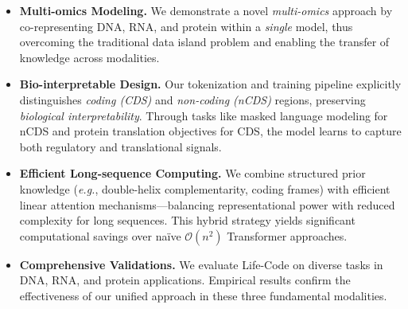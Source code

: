 \begin{itemize}
    \vspace{-0.5em}
    \item \textbf{Multi-omics Modeling.} 
    We demonstrate a novel \textit{multi-omics} approach by co-representing DNA, RNA, and protein within a \textit{single} model, thus overcoming the traditional data island problem and enabling the transfer of knowledge across modalities.
    
    \vspace{-2pt}
    \item \textbf{Bio-interpretable Design.} 
    Our tokenization and training pipeline explicitly distinguishes \textit{coding (CDS)} and \textit{non-coding (nCDS)} regions, preserving \textit{biological interpretability}. Through tasks like masked language modeling for nCDS and protein translation objectives for CDS, the model learns to capture both regulatory and translational signals.

    \vspace{-2pt}
    \item \textbf{Efficient Long-sequence Computing.}
    We combine structured prior knowledge (\textit{e.g.}, double-helix complementarity, coding frames) with efficient linear attention mechanisms---balancing representational power with reduced complexity for long sequences. This hybrid strategy yields significant computational savings over na\"ive \(\mathcal{O}(n^2)\) Transformer approaches.

    \vspace{-2pt}
    \item \textbf{Comprehensive Validations.}
    We evaluate Life-Code on diverse tasks in DNA, RNA, and protein applications. Empirical results confirm the effectiveness of our unified approach in these three fundamental modalities.
\end{itemize}
